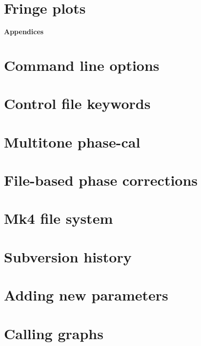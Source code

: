 \documentclass{article}
\begin{document}
\section{Fringe plots}


\begin{appendices}
\newpage
\begin{center}
{\huge {\bf Appendices}}
\end{center}
\section{Command line options} \label{app:commandlineoptions}


\section{Control file keywords} \label{app:controlfilekeywords}


\section{Multitone phase-cal} \label{app:multitonepcal}


\section{File-based phase corrections} \label{app:filebasedpcal}


\section{Mk4 file system} \label{app:mk4filesystem}


\section{Subversion history} \label{app:subversionhistory}


\section{Adding new parameters} \label{app:addingnewparameters}


\section{Calling graphs} \label{app:callinggraphs}


\end{appendices}
\end{document}
